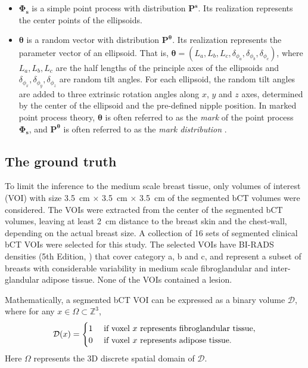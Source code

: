 \documentclass[journal]{IEEEtran}
\begin{document}
\begin{itemize}

\item $\mathbf{\Phi_s}$ is a simple point process with distribution
  $\mathbf{P}^{\mathbf{s}}$. Its realization represents the center
  points of the ellipsoids.

\item $\boldsymbol{\theta}$ is a random vector with distribution
  $\mathbf{P}^{\boldsymbol{\theta}}$. Its realization represents the
  parameter vector of an ellipsoid. That is,
  $\boldsymbol{\theta} = \left( L_a, L_b, L_c, \delta_{\phi_a},
    \delta_{\phi_b}, \delta_{\phi_c} \right)$, where $L_a, L_b, L_c$
  are the half lengths of the principle axes of the ellipsoids and
  $\delta_{\phi_{x}},\delta_{\phi_{y}},\delta_{\phi_{z}}$ are random
  tilt angles. For each ellipsoid, the random tilt angles are added to
  three extrinsic rotation angles along $x$, $y$ and $z$ axes,
  determined by the center of the ellipsoid and the pre-defined nipple
  position. In marked point process theory, $\boldsymbol{\theta}$ is
  often referred to as the \textit{mark} of the point process
  $\mathbf{\Phi_s}$, and $\mathbf{P}^{\boldsymbol{\theta}}$ is often
  referred to as the \textit{mark distribution}
  \cite{chiu2013stochastic}.
\end{itemize}

\subsection{The ground truth}
\label{sec:ground-truth}

To limit the inference to the medium scale breast tissue, only volumes
of interest (VOI) with size \SI{3.5}{\cm} $\times$ \SI{3.5}{\cm}
$\times$ \SI{3.5}{\cm} of the segmented bCT volumes were
considered. The VOIs were extracted from the center of the segmented
bCT volumes, leaving at least \SI{2}{\cm} distance to the breast skin
and the chest-wall, depending on the actual breast size. A collection
of 16 sets of segmented clinical bCT VOIs were selected for this
study. The selected VOIs have BI-RADS densities (5th Edition,
\cite{d2013acr}) that cover category a, b and c, and represent a
subset of breasts with considerable variability in medium scale
fibroglandular and inter-glandular adipose tissue. None of the VOIs
contained a lesion.

Mathematically, a segmented bCT VOI can be expressed as a binary
volume $\mathcal{D}$, where for any
$x \in \Omega \subset \mathbb{Z}^3$,
\begin{equation}
  \label{eq:bct-discrete-form}
  \mathcal{D}(x) =
  \begin{cases}
    1 & \textnormal{ if voxel } x \textnormal{ represents
      fibroglandular tissue}, \\
    0 & \textnormal{ if voxel } x \textnormal{ represents
      adipose tissue}. \\
  \end{cases}
\end{equation}
Here $\Omega$ represents the 3D discrete spatial domain of
$\mathcal{D}$.
\end{document}
